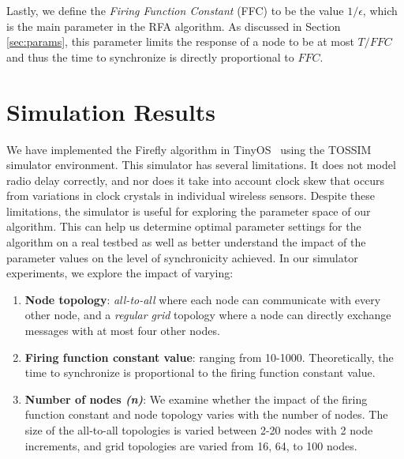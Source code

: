 \documentclass{sig-alternate}
\begin{document}
{\begin{description}
\end{description}


Lastly, we define the {\em Firing Function Constant} (FFC) to be the
value $1/\epsilon$, which is the main parameter in the RFA
algorithm. As discussed in Section \ref{sec:params}, this parameter
limits the response of a node to be at most $T/FFC$ and
thus the time to synchronize is directly proportional to
$FFC$. 

\section{Simulation Results}
\label{sec-simulations}

We have implemented the Firefly algorithm in
TinyOS~\cite{tinyos-asplos00} using the TOSSIM~\cite{tossim} simulator
environment. This simulator has several limitations.  It does not
model radio delay correctly, and nor does it take into account clock
skew that occurs from variations in clock crystals in individual
wireless sensors. Despite these limitations, the simulator is useful
for exploring the parameter space of our algorithm.  This can help us
determine optimal parameter settings for the algorithm on a real
testbed as well as better understand the impact of the parameter
values on the level of synchronicity achieved. In our simulator
experiments, we explore the impact of varying:

\begin{enumerate}\addtolength{\itemsep}{-0.5\baselineskip}
\item {\bf Node topology}: \emph{all-to-all} where each node can
communicate with every other node, and a \emph{regular grid} topology
where a node can directly exchange messages with at most four other
nodes.
\item {\bf Firing function constant value}: ranging from
10-1000. Theoretically, the time to synchronize is proportional to the
firing function constant value.
\item {\bf Number of nodes {\em (n)}}: We examine whether the impact of the
firing function constant and node topology varies with the number of
nodes. The size of the all-to-all topologies is varied between 2-20
nodes with 2 node increments, and grid topologies are varied from 16,
64, to 100 nodes.
\end{enumerate}

}
\end{document}
